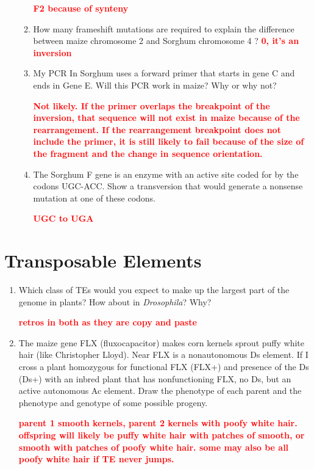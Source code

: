 \documentclass[]{article}
\newcommand{\answer}[1]{\textcolor{red}{\bf #1}}
\begin{document}
\begin{enumerate}
\begin{enumerate}
\answer{F2 because of synteny}

\item How many frameshift mutations are required to explain the difference between maize chromosome 2 and Sorghum chromosome 4 ?
\answer{0, it's an inversion} 

\item My PCR In Sorghum uses a forward primer that starts in gene C and ends in Gene E.  Will this PCR work in maize?  Why or why not? 

\answer{Not likely.  If the primer overlaps the breakpoint of the inversion, that sequence will not exist in maize because of the rearrangement.  If the rearrangement breakpoint does not include the primer, it is still likely to fail because of the size of the fragment and the change in sequence orientation.}

\item The Sorghum F gene is an enzyme with an active site coded for by the codons UGC-ACC.  Show a transversion that would generate a nonsense mutation at one of these codons. 
	
\answer{UGC to UGA}

\end{enumerate}
\end{enumerate}

\section*{Transposable Elements}
\begin{enumerate}
\item Which class of TEs would you expect to make up the largest part of the genome in plants? How about in \emph{Drosophila}? Why?

\answer{ retros in both as they are copy and paste }
\item The maize gene FLX (fluxocapacitor) makes corn kernels sprout puffy white hair (like Christopher Lloyd). Near FLX is a nonautonomous Ds element. If I cross a plant homozygous for functional FLX (FLX+) and presence of the Ds (Ds+) with an inbred plant that has nonfunctioning FLX, no Ds, but an active autonomous Ac element. Draw the phenotype of each parent and the phenotype and genotype of some possible progeny.

\answer{parent 1 smooth kernels, parent 2 kernels with poofy white hair. offspring will likely be puffy white hair with patches of smooth, or smooth with patches of poofy white hair. some may also be all poofy white hair if TE never jumps.}

\end{enumerate}
\end{document}
